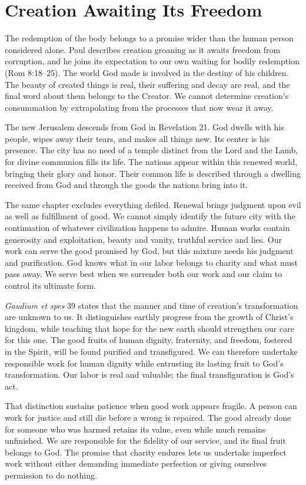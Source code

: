 \section{Creation Awaiting Its Freedom}

The redemption of the body belongs to a promise wider than the human person considered alone. Paul describes creation groaning as it awaits freedom from corruption, and he joins its expectation to our own waiting for bodily redemption (Rom 8:18--25). The world God made is involved in the destiny of his children. The beauty of created things is real, their suffering and decay are real, and the final word about them belongs to the Creator. We cannot determine creation's consummation by extrapolating from the processes that now wear it away.

The new Jerusalem descends from God in Revelation 21. God dwells with his people, wipes away their tears, and makes all things new. Its center is his presence. The city has no need of a temple distinct from the Lord and the Lamb, for divine communion fills its life. The nations appear within this renewed world, bringing their glory and honor. Their common life is described through a dwelling received from God and through the goods the nations bring into it.

The same chapter excludes everything defiled. Renewal brings judgment upon evil as well as fulfillment of good. We cannot simply identify the future city with the continuation of whatever civilization happens to admire. Human works contain generosity and exploitation, beauty and vanity, truthful service and lies. Our work can serve the good promised by God, but this mixture needs his judgment and purification. God knows what in our labor belongs to charity and what must pass away. We serve best when we surrender both our work and our claim to control its ultimate form.

\emph{Gaudium et spes} 39 states that the manner and time of creation's transformation are unknown to us. It distinguishes earthly progress from the growth of Christ's kingdom, while teaching that hope for the new earth should strengthen our care for this one. The good fruits of human dignity, fraternity, and freedom, fostered in the Spirit, will be found purified and transfigured. We can therefore undertake responsible work for human dignity while entrusting its lasting fruit to God's transformation. Our labor is real and valuable; the final transfiguration is God's act.

That distinction sustains patience when good work appears fragile. A person can work for justice and still die before a wrong is repaired. The good already done for someone who was harmed retains its value, even while much remains unfinished. We are responsible for the fidelity of our service, and its final fruit belongs to God. The promise that charity endures lets us undertake imperfect work without either demanding immediate perfection or giving ourselves permission to do nothing.

